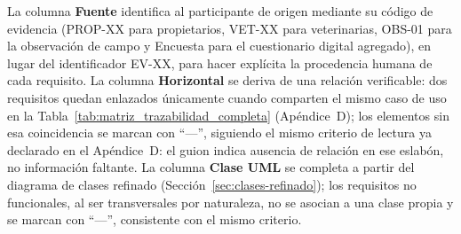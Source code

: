 \documentclass[journal,onecolumn]{IEEEtran}
\begin{document}
La columna \textbf{Fuente} identifica al participante de origen mediante su
código de evidencia (PROP-XX para propietarios, VET-XX para veterinarias,
OBS-01 para la observación de campo y Encuesta para el cuestionario digital
agregado), en lugar del identificador EV-XX, para hacer explícita la
procedencia humana de cada requisito. La columna \textbf{Horizontal} se
deriva de una relación verificable: dos requisitos quedan enlazados
únicamente cuando comparten el mismo caso de uso en la
Tabla~\ref{tab:matriz_trazabilidad_completa} (Apéndice~D); los elementos sin
esa coincidencia se marcan con \enquote{---}, siguiendo el mismo criterio de
lectura ya declarado en el Apéndice~D: el guion indica ausencia de relación
en ese eslabón, no información faltante. La columna \textbf{Clase UML} se
completa a partir del diagrama de clases refinado
(Sección~\ref{sec:clases-refinado}); los requisitos no funcionales, al ser
transversales por naturaleza, no se asocian a una clase propia y se marcan
con \enquote{---}, consistente con el mismo criterio.
\end{document}
